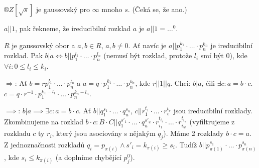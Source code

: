 \documentclass[12pt]{article}                   %
\begin{document}
        \begin{priklad}
            $®Z[\sqrt{s}]$ je gaussovský pro $∞$ mnoho $s$. (Čeká se, že ano.)
        \end{priklad}

        \begin{poznamka}
            $a||1$, pak řekneme, že ireducibilní rozklad $a$ je $a||1 = …^0$.
        \end{poznamka}

        \begin{tvrzeni}
            $R$ je gaussovský obor a $a, b \in R$, $a, b ≠ 0$. Ať navíc je $a || p_1^{k_1}·…·p_n^{k_n}$ je ireducibilní rozklad. Pak $b|a \Leftrightarrow b || p_1^{l_1}·…·p_n^{l_n}$ (nemusí být rozklad, protože $l_i$ smí být 0), kde $\forall i: 0≤l_i≤k_i$.

            \begin{dukazin}
                $\Rightarrow$: Ať $b = rp_1^{l_1}·…·p_n^{l_n}$ a $a = q·p_1^{k_1}·…·p_n^{k_n}$, kde $r || 1 || q$. Chci: $b|a$, čili $\exists c: a=b·c$. $c = q·r^{-1}·p_1^{k_1-l_1}·…·p_n^{k_n - l_n}$.

                $\implies$: $b|a \implies \exists c: a = b·c$. Ať $b||q_1^{s_1}·…·q_u^{s_u}$, $c || r_1^{t_1}·…·r_v^{t_v}$ jsou ireducibilní rozklady. Zkombinujeme na rozklad $b·c: B·C||q_1^{s'_1}·…·q_u^{s'_u}·r_{i_1}^{t_{i_1}}·…·r_{i_w}^{t_{i_w}}$ (vyfiltrujeme z rozkladu $c$ ty $r_i$, který jsou asociovány s nějakým $q_j$). Máme 2 rozklady $b·c = a$. Z jednoznačnosti rozkladů $q_i = p_{\pi(i)} \land s'_i = k_{\pi(i)} ≥ s_i$. Tudíž $b || p_{\pi(1)}^{s_1}·…·p_{\pi(n)}^{s_n}$, kde $s_i ≤ k_{\pi(i)}$ (a doplníme chybějící $p_j^0$).
            \end{dukazin}
        \end{tvrzeni}

\end{document}
